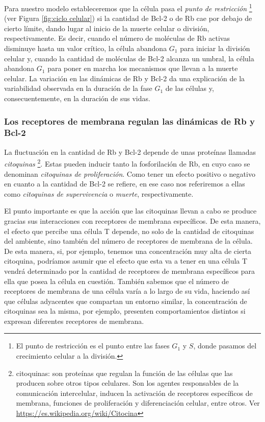 Para nuestro modelo estableceremos que la célula pasa el \textit{punto de restricción} \footnote{El punto de restricción es el punto entre las fases $G_{1}$ y $S$, donde pasamos del crecimiento celular a la división.} (ver Figura \ref{fig:ciclo celular}) si la cantidad de Bcl-2 o de Rb cae por debajo de cierto límite, dando lugar al inicio de la muerte celular o división, respectivamente. Es decir, cuando el número
de moléculas de Rb activas disminuye hasta un valor crítico, la célula abandona $G_1$ para iniciar la división celular y, cuando la cantidad de moléculas de Bcl-2 alcanza un umbral, la célula abandona $G_1$ para poner en marcha los mecanismos que llevan a la muerte celular. La variación en las dinámicas de Rb y Bcl-2 da una explicación de la variabilidad observada en la duración de la fase $G_{1}$ de las células y, consecuentemente, en la duración de sus vidas.

\subsubsection{Los receptores de membrana regulan las dinámicas de Rb y Bcl-2}
\label{subsub:hip_recep}

La fluctuación en la cantidad de Rb y Bcl-2 depende de unas proteínas llamadas \textit{citoquinas} \footnote{citoquinas: son proteínas que regulan la función de las células que las producen sobre otros tipos celulares. Son los agentes responsables de la comunicación intercelular, inducen la activación de receptores específicos de membrana, funciones de proliferación y diferenciación celular, entre otros. Ver \url{https://es.wikipedia.org/wiki/Citocina}}. Estas pueden inducir tanto la fosforilación de Rb, en cuyo caso se denominan \textit{citoquinas de proliferación}. Como tener un efecto positivo o negativo en cuanto a la cantidad de Bcl-2 se refiere, en ese caso nos referiremos a ellas como \textit{citoquinas de supervivencia} o \textit{muerte}, respectivamente.

El punto importante es que la acción que las citoquinas llevan a cabo se produce gracias sus interacciones con receptores de membrana específicos. De esta manera, el efecto que percibe una célula T depende, no solo de la cantidad de citoquinas del ambiente, sino también del número de receptores de membrana de la célula. De esta manera, si, por ejemplo, tenemos una concentración muy alta de cierta citoquina, podríamos asumir que el efecto que esta va a tener en una célula T vendrá determinado por la cantidad de receptores de membrana específicos para ella que posea la célula en cuestión. También sabemos que el número de receptores de membrana de una célula varía a lo largo de su vida, haciendo así que células adyacentes que compartan un entorno similar, la concentración de citoquinas sea la misma, por ejemplo, presenten comportamientos distintos si expresan diferentes receptores de membrana.

